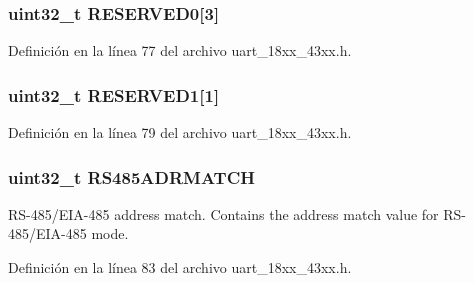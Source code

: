 \subsubsection[{\texorpdfstring{R\+E\+S\+E\+R\+V\+E\+D0}{RESERVED0}}]{\setlength{\rightskip}{0pt plus 5cm}uint32\+\_\+t R\+E\+S\+E\+R\+V\+E\+D0\mbox{[}3\mbox{]}}\hypertarget{struct_l_p_c___u_s_a_r_t___t_a8d5872ef46261e096eae509eec8bc5c3}{}\label{struct_l_p_c___u_s_a_r_t___t_a8d5872ef46261e096eae509eec8bc5c3}


Definición en la línea 77 del archivo uart\+\_\+18xx\+\_\+43xx.\+h.

\subsubsection[{\texorpdfstring{R\+E\+S\+E\+R\+V\+E\+D1}{RESERVED1}}]{ uint32\+\_\+t R\+E\+S\+E\+R\+V\+E\+D1\mbox{[}1\mbox{]}}\hypertarget{struct_l_p_c___u_s_a_r_t___t_a606a37e6c3d5b6067982d4f7997395d1}{}\label{struct_l_p_c___u_s_a_r_t___t_a606a37e6c3d5b6067982d4f7997395d1}


Definición en la línea 79 del archivo uart\+\_\+18xx\+\_\+43xx.\+h.

\subsubsection[{\texorpdfstring{R\+S485\+A\+D\+R\+M\+A\+T\+CH}{RS485ADRMATCH}}]{ uint32\+\_\+t R\+S485\+A\+D\+R\+M\+A\+T\+CH}\hypertarget{struct_l_p_c___u_s_a_r_t___t_af3474404c184dbae6cdee388d3ae17d3}{}\label{struct_l_p_c___u_s_a_r_t___t_af3474404c184dbae6cdee388d3ae17d3}
R\+S-\/485/\+E\+I\+A-\/485 address match. Contains the address match value for R\+S-\/485/\+E\+I\+A-\/485 mode. 

Definición en la línea 83 del archivo uart\+\_\+18xx\+\_\+43xx.\+h.

